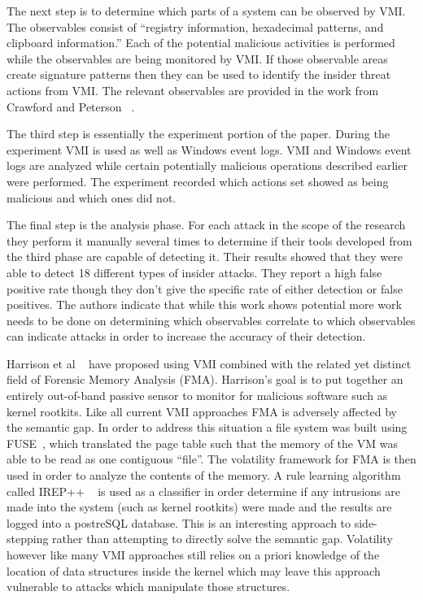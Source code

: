 The next step is to determine which parts of a system can be observed by VMI. The observables consist of ``registry information, hexadecimal patterns, and clipboard information.'' Each of the potential malicious activities is performed while the observables are being monitored by VMI. If those observable areas create signature patterns then they can be used to identify the insider threat actions from VMI. The relevant observables are provided in the work from Crawford and Peterson ~\cite{crawford_insider_2013}. 

The third step is essentially the experiment portion of the paper. During the experiment VMI is used as well as Windows event logs. VMI and Windows event logs are analyzed while certain potentially malicious operations described earlier were performed. The experiment recorded which actions set showed as being malicious and which ones did not. 

The final step is the analysis phase. For each attack in the scope of the research they perform it manually several times to determine if their tools developed from the third phase are capable of detecting it. Their results showed that they were able to detect 18 different types of insider attacks. They report a high false positive rate though they don't give the specific rate of either detection or false positives. The authors indicate that while this work shows potential more work needs to be done on determining which observables correlate to which observables can indicate attacks in order to increase the accuracy of their detection. 

Harrison et al ~\cite{harrison_constructing_2012} have proposed using VMI combined with the related yet distinct field of Forensic Memory Analysis (FMA). Harrison's goal is to put together an entirely out-of-band passive sensor to monitor for malicious software such as kernel rootkits. Like all current VMI approaches FMA is adversely affected by the semantic gap. In order to address this situation a file system was built using FUSE~\cite{rajgarhia_performance_2010}, which translated the page table such that the memory of the VM was able to be read as one contiguous ``file''. The volatility framework for FMA is then used in order to analyze the contents of the memory. A rule learning algorithm called IREP++ ~\cite{dain_irep_2004} is used as a classifier in order determine if any intrusions are made into the system (such as kernel rootkits) were made and the results are logged into a postreSQL database. This is an interesting approach to side-stepping rather than attempting to directly solve the semantic gap. Volatility however like many VMI approaches still relies on a priori knowledge of the location of data structures inside the kernel which may leave this approach vulnerable to attacks which manipulate those structures. 

